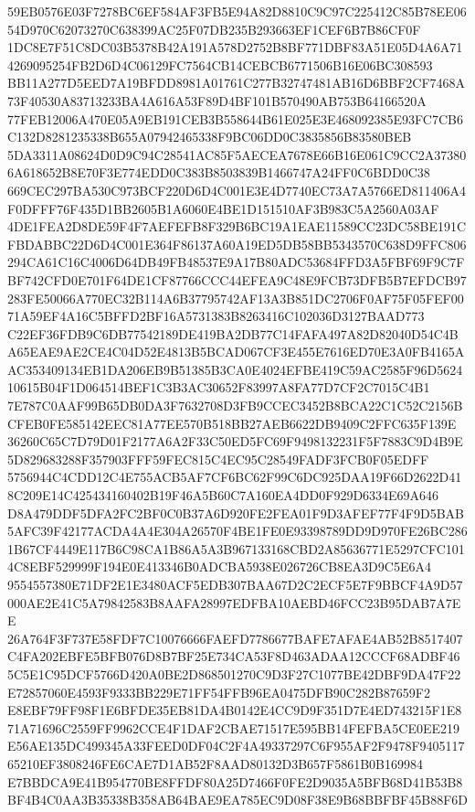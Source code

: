 \documentclass[UTF8,fontset=fandol,zihao=-4,a4paper]{ctexart}
\begin{document}
{{59EB0576E03F7278BC6EF584AF3FB5E94A82D8810C9C97C225412C85B78EE0654D970C62073270C638399AC25F07DB235B293663EF1CEF6B7B86CF0F
1DC8E7F51C8DC03B5378B42A191A578D2752B8BF771DBF83A51E05D4A6A714269095254FB2D6D4C06129FC7564CB14CEBCB6771506B16E06BC308593
BB11A277D5EED7A19BFDD8981A01761C277B32747481AB16D6BBF2CF7468A73F40530A83713233BA4A616A53F89D4BF101B570490AB753B64166520A
77FEB12006A470E05A9EB191CEB3B558644B61E025E3E468092385E93FC7CB6C132D8281235338B655A07942465338F9BC06DD0C3835856B83580BEB
5DA3311A08624D0D9C94C28541AC85F5AECEA7678E66B16E061C9CC2A373806A618652B8E70F3E774EDD0C383B8503839B1466747A24FF0C6BDD0C38
669CEC297BA530C973BCF220D6D4C001E3E4D7740EC73A7A5766ED811406A4F0DFFF76F435D1BB2605B1A6060E4BE1D151510AF3B983C5A2560A03AF
4DE1FEA2D8DE59F4F7AEFEFB8F329B6BC19A1EAE11589CC23DC58BE191CFBDABBC22D6D4C001E364F86137A60A19ED5DB58BB5343570C638D9FFC806
294CA61C16C4006D64DB49FB48537E9A17B80ADC53684FFD3A5FBF69F9C7FBF742CFD0E701F64DE1CF87766CCC44EFEA9C48E9FCB73DFB5B7EFDCB97
283FE50066A770EC32B114A6B37795742AF13A3B851DC2706F0AF75F05FEF0071A59EF4A16C5BFFD2BF16A5731383B8263416C102036D3127BAAD773
C22EF36FDB9C6DB77542189DE419BA2DB77C14FAFA497A82D82040D54C4BA65EAE9AE2CE4C04D52E4813B5BCAD067CF3E455E7616ED70E3A0FB4165A
AC353409134EB1DA206EB9B51385B3CA0E4024EFBE419C59AC2585F96D562410615B04F1D064514BEF1C3B3AC30652F83997A8FA77D7CF2C7015C4B1
7E787C0AAF99B65DB0DA3F7632708D3FB9CCEC3452B8BCA22C1C52C2156BCFEB0FE585142EEC81A77EE570B518BB27AEB6622DB9409C2FFC635F139E
36260C65C7D79D01F2177A6A2F33C50ED5FC69F9498132231F5F7883C9D4B9E5D829683288F357903FFF59FEC815C4EC95C28549FADF3FCB0F05EDFF
5756944C4CDD12C4E755ACB5AF7CF6BC62F99C6DC925DAA19F66D2622D418C209E14C425434160402B19F46A5B60C7A160EA4DD0F929D6334E69A646
D8A479DDF5DFA2FC2BF0C0B37A6D920FE2FEA01F9D3AFEF77F4F9D5BAB5AFC39F42177ACDA4A4E304A26570F4BE1FE0E93398789DD9D970FE26BC286
1B67CF4449E117B6C98CA1B86A5A3B967133168CBD2A85636771E5297CFC1014C8EBF529999F194E0E413346B0ADCBA5938E026726CB8EA3D9C5E6A4
9554557380E71DF2E1E3480ACF5EDB307BAA67D2C2ECF5E7F9BBCF4A9D57000AE2E41C5A79842583B8AAFA28997EDFBA10AEBD46FCC23B95DAB7A7EE
26A764F3F737E58FDF7C10076666FAEFD7786677BAFE7AFAE4AB52B8517407C4FA202EBFE5BFB076D8B7BF25E734CA53F8D463ADAA12CCCF68ADBF46
5C5E1C95DCF5766D420A0BE2D868501270C9D3F27C1077BE42DBF9DA47F22E72857060E4593F9333BB229E71FF54FFB96EA0475DFB90C282B87659F2
E8EBF79FF98F1E6BFDE35EB81DA4B0142E4CC9D9F351D7E4ED743215F1E871A71696C2559FF9962CCE4F1DAF2CBAE71517E595BB14FEFBA5CE0EE219
E56AE135DC499345A33FEED0DF04C2F4A49337297C6F955AF2F9478F940511765210EF3808246FE6CAE7D1AB52F8AAD80132D3B657F5861B0B169984
E7BBDCA9E41B954770BE8FFDF80A25D7466F0FE2D9035A5BFB68D41B53B8BF4B4C0AA3B35338B358AB64BAE9EA785EC9D08F38E9B68BBFBF45B88F6D
}}
\end{document}
